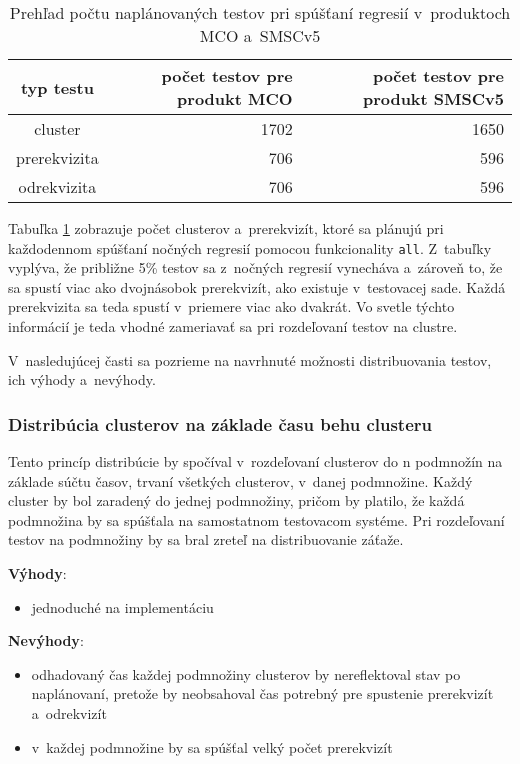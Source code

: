 \begin{table}
  \begin{center}
    \begin{tabular}{| c | r | r |}
    \hline
    typ testu  & počet testov pre produkt MCO & počet testov pre produkt SMSCv5 \\ \hline
    cluster      & 1702 & 1650 \\ \hline
    prerekvizita & 706  & 596  \\ \hline
    odrekvizita  & 706  & 596 \\
    \hline
    \end{tabular}
    \label{table:pocet_naplanovanych_testov}
    \caption{Prehľad počtu naplánovaných testov pri spúšťaní regresií v~produktoch MCO a~SMSCv5}
  \end{center}
\end{table}

Tabuľka \ref{table:pocet_naplanovanych_testov} zobrazuje počet clusterov a~prerekvizít, ktoré sa plánujú
pri každodennom spúšťaní nočných regresií pomocou funkcionality \texttt{all}. Z~tabuľky vyplýva, že približne 5\% testov sa 
z~nočných regresií vynecháva a~zároveň to, že sa spustí viac ako dvojnásobok prerekvizít, ako existuje v~testovacej sade.
Každá prerekvizita sa teda spustí v~priemere viac ako dvakrát. 
Vo svetle týchto informácií je teda vhodné zameriavať sa pri rozdeľovaní testov na clustre.

V~nasledujúcej časti sa pozrieme na navrhnuté možnosti distribuovania testov, ich výhody a~nevýhody.
\subsubsection*{Distribúcia clusterov na základe času behu clusteru}
Tento princíp distribúcie by spočíval v~rozdeľovaní clusterov do n podmnožín na základe súčtu časov, 
trvaní všetkých clusterov, v~danej podmnožine. Každý cluster by bol zaradený do jednej podmnožiny, pričom by platilo,
že každá podmnožina by sa spúšťala na samostatnom testovacom systéme. Pri rozdeľovaní testov na podmnožiny by sa bral zreteľ na
distribuovanie záťaže.

\noindent \textbf{Výhody}:
\begin{itemize}
\item jednoduché na implementáciu
\end{itemize} 

\noindent \textbf{Nevýhody}:
\begin{itemize}
\item odhadovaný čas každej podmnožiny clusterov by nereflektoval stav po naplánovaní, pretože by
neobsahoval čas potrebný pre spustenie prerekvizít a~odrekvizít
\item v~každej podmnožine by sa spúšťal velký počet prerekvizít
\end{itemize}

